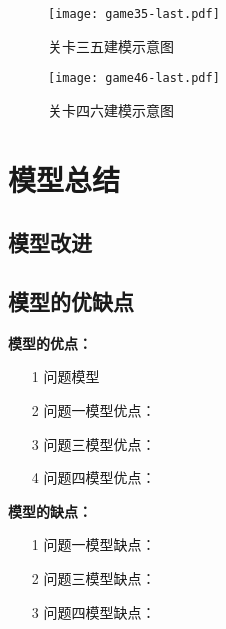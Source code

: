 \documentclass{cumcmthesis}
\begin{document}
\begin{figure}[!h]
	\centering
	\texttt{[image: game35-last.pdf]}
	\caption{关卡三五建模示意图}
\end{figure}

\begin{figure}[!h]
	\centering
	\texttt{[image: game46-last.pdf]}
	\caption{关卡四六建模示意图}
\end{figure}

\newpage
\section{模型总结}
\subsection{模型改进}

\subsection{模型的优缺点}

\textbf{模型的优点：}
\begin{itemize}
	\item[1] 问题模型
	\item[2] 问题一模型优点：
	\item[3] 问题三模型优点：
	\item[4] 问题四模型优点：
\end{itemize}

\textbf{模型的缺点：}
\begin{itemize}
	\item[1] 问题一模型缺点：
	\item[2] 问题三模型缺点：
	\item[3] 问题四模型缺点：
\end{itemize}

\newpage

\end{document}
